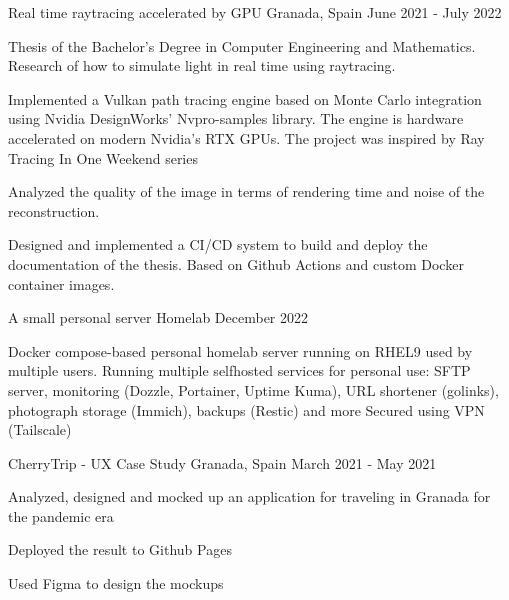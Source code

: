 
\begin{cventries}
    \cventry
      {}
      {Real time raytracing accelerated by GPU}
      {Granada, Spain}
      {June 2021 - July 2022}
      {
        \begin{cvitems} %
          \item {Thesis of the Bachelor's Degree in Computer Engineering and Mathematics. Research of how to simulate light in real time using raytracing.}
          \item {Implemented a Vulkan path tracing engine based on Monte Carlo integration using Nvidia DesignWorks' Nvpro-samples library. The engine is hardware accelerated on modern Nvidia's RTX GPUs. The project was inspired by Ray Tracing In One Weekend series}
          \item {Analyzed the quality of the image in terms of rendering time and noise of the reconstruction.}
          \item {Designed and implemented a CI/CD system to build and deploy the documentation of the thesis. Based on Github Actions and custom Docker container images.}
        \end{cvitems}
      }

    \cventry
        {A small personal server}
        {Homelab}
        {}
        {December 2022}
        {
          \begin{cvitems} %
            {Docker compose-based personal homelab server running on RHEL9 used by multiple users.}
            {Running multiple selfhosted services for personal use: SFTP server, monitoring (Dozzle, Portainer, Uptime Kuma), URL shortener (golinks), photograph storage (Immich), backups (Restic) and more}
            {Secured using VPN (Tailscale)}
          \end{cvitems}
        }

    \cventry
      {}
      {CherryTrip - UX Case Study}
      {Granada, Spain}
      {March 2021 - May 2021}
      {
        \begin{cvitems} %
          \item {Analyzed, designed and mocked up an application for traveling in Granada for the pandemic era }
          \item {Deployed the result to Github Pages}
          \item {Used Figma to design the mockups}
        \end{cvitems}
      }


\end{cventries}
